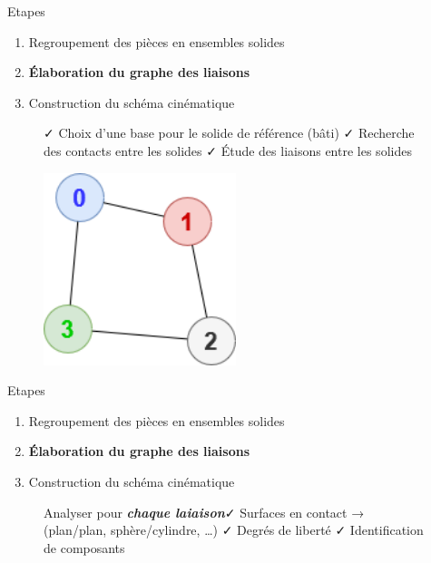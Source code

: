 \documentclass[
  ignorenonframetext,
  aspectratio=169,
  c]{beamer}
\providecommand{\tightlist}{%
  \setlength{\itemsep}{0pt}\setlength{\parskip}{0pt}}\usepackage{longtable,booktabs,array}
\begin{document}
\begin{frame}{Etapes}
\label{etapes-2}
\begin{enumerate}
\tightlist
\item
  {Regroupement des pièces en ensembles solides}
\item
  \textbf{Élaboration du graphe des liaisons}
\item
  {Construction du schéma cinématique}
\end{enumerate}

\begin{figure}

\begin{minipage}{0.70\linewidth}
✓ Choix d'une base pour le solide de référence (bâti) ✓ Recherche des
contacts entre les solides ✓ Étude des liaisons entre les
solides\end{minipage}%
%
\begin{minipage}{0.30\linewidth}
\begin{center}
\includegraphics[width=0.5\textwidth,height=\textheight]{CM3/Graphe-des-liaisons.png}
\end{center}
\end{minipage}%

\end{figure}%
\end{frame}

\begin{frame}{Etapes}
\label{etapes-3}
\begin{enumerate}
\tightlist
\item
  {Regroupement des pièces en ensembles solides}
\item
  \textbf{Élaboration du graphe des liaisons}
\item
  {Construction du schéma cinématique}
\end{enumerate}

\begin{figure}

\begin{minipage}{0.80\linewidth}
Analyser pour \textbf{\emph{chaque laiaison}}✓ Surfaces en contact →
(plan/plan, sphère/cylindre, \ldots) ✓ Degrés de liberté ✓
Identification de composants\end{minipage}%

\end{figure}%
\end{frame}
\end{document}
